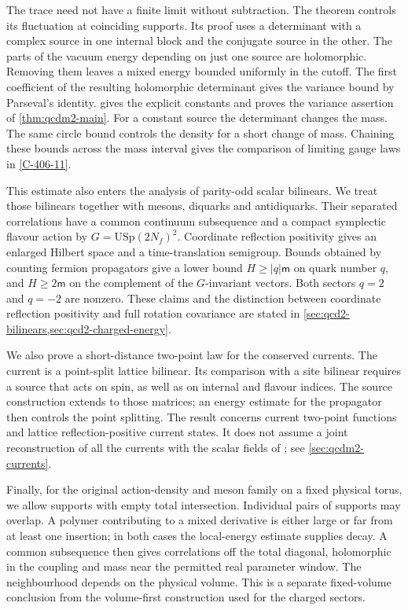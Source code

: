 \documentclass[11pt,letterpaper,reqno]{amsart}
\theoremstyle{definition}
\theoremstyle{remark}
\begin{document}
The trace need not have a finite limit without subtraction.
The theorem controls its fluctuation at coinciding supports.
Its proof uses a determinant with a complex source in one
internal block and the conjugate source in the other.
The parts of the vacuum energy depending on just one source
are holomorphic. Removing them leaves a mixed energy bounded
uniformly in the cutoff. The first coefficient of the resulting
holomorphic determinant gives the variance bound by Parseval's
identity.  gives the explicit constants and
proves the variance assertion of \cref{thm:qcdm2-main}.
For a constant source the determinant changes the mass.
The same circle bound controls the density for a short
change of mass. Chaining these bounds across the mass
interval gives the comparison of limiting gauge laws in
\cref{C-406-11}.

This estimate also enters the analysis of parity-odd scalar
bilinears. We treat those bilinears together with mesons,
diquarks and antidiquarks. Their separated correlations have
a common continuum subsequence and a compact symplectic
flavour action by $G=\mathrm{USp}(2N_f)^2$.
Coordinate reflection positivity gives an
enlarged Hilbert space and a time-translation semigroup.
Bounds obtained by counting fermion propagators give a lower
bound $H\ge|q|\mathsf m$ on quark number $q$, and
$H\ge2\mathsf m$ on the complement of the $G$-invariant
vectors. Both sectors $q=2$ and $q=-2$ are nonzero. These claims
and the distinction between coordinate reflection positivity
and full rotation covariance are stated in
\cref{sec:qcd2-bilinears,sec:qcd2-charged-energy}.

We also prove a short-distance two-point law for the conserved
currents. The current is a point-split lattice bilinear. Its
comparison with a site bilinear requires a source that acts
on spin, as well as on internal and flavour indices. The
source construction extends to those matrices; an energy
estimate for the propagator then controls the point splitting.
The result concerns current two-point functions and lattice
reflection-positive current states. It does not assume a
joint reconstruction of all the currents with the scalar
fields of \cite{QCDM1}; see \cref{sec:qcdm2-currents}.

Finally, for the original action-density and meson family
on a fixed physical torus, we allow supports with
empty total intersection. Individual pairs of supports may
overlap. A polymer contributing to a mixed derivative is
either large or far from at least one insertion; in both
cases the local-energy estimate supplies decay. A common
subsequence then gives correlations off the total diagonal,
holomorphic in the coupling and mass near the permitted real
parameter window. The neighbourhood depends on the physical
volume. This is a separate fixed-volume conclusion from the
volume-first construction used for the charged sectors.
\end{document}

